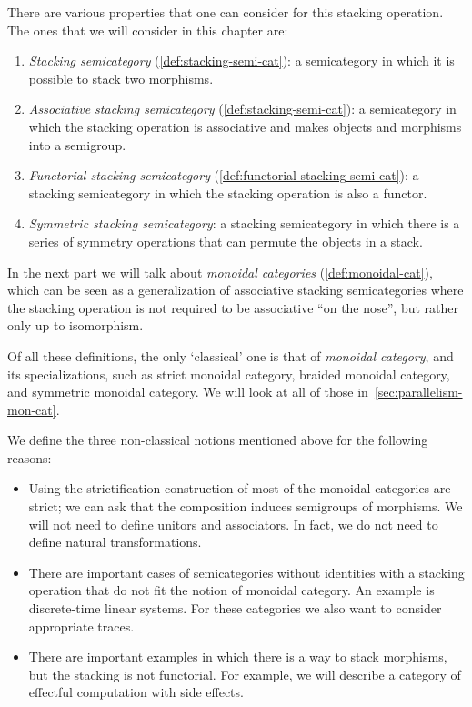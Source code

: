 There are various properties that one can consider for this stacking operation.
The ones that we will consider in this chapter are:
%
\begin{enumerate}
    \item \emph{Stacking semicategory} (\cref{def:stacking-semi-cat}): a semicategory in which  it is possible to stack two morphisms.
    \item \emph{Associative stacking semicategory} (\cref{def:stacking-semi-cat}): a semicategory in which the stacking operation is associative and makes objects and morphisms into a semigroup.
    \item \emph{Functorial stacking semicategory} (\cref{def:functorial-stacking-semi-cat}): a stacking semicategory in which the stacking operation is also a functor.
    \item \emph{Symmetric stacking semicategory}: a stacking semicategory in which there is a series of symmetry operations that can permute the objects in a stack.
\end{enumerate}
%
In the next part we will talk about \emph{monoidal categories} (\cref{def:monoidal-cat}), which can be seen as a generalization of associative stacking semicategories where the stacking operation is not required to be associative ``on the nose'', but rather only up to isomorphism.

\begin{remark}
    Of all these definitions, the only `classical' one is that of \emph{monoidal category}, and its specializations, such as strict monoidal category, braided monoidal category, and symmetric monoidal category.
    We will look at all of those in~\cref{sec:parallelism-mon-cat}.

    We define the three non-classical notions mentioned above for the following reasons:
    \begin{itemize}
        \item Using the strictification construction of \SetL most of the monoidal categories are strict; we can ask that the composition induces semigroups of morphisms.
              We will not need to define unitors and associators.
              In fact, we do not need to define natural transformations.
        \item There are important cases of semicategories without identities with a stacking operation that do not fit the notion of monoidal category.
              An example is discrete-time linear systems.
              For these categories we also want to consider appropriate traces.
        \item There are important examples in which there is a way to stack morphisms, but the stacking is not functorial.
              For example, we will describe a category of effectful computation with side effects.
    \end{itemize}
\end{remark}

